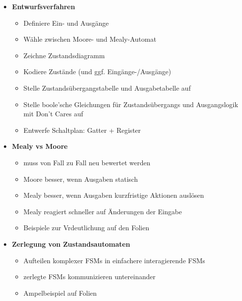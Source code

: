 \documentclass[11pt,a4paper]{article}
\begin{document}
\begin{itemize}
\begin{itemize}
\item \textbf{Entwurfsverfahren}
	\begin{itemize}
	\item Definiere Ein- und Ausgänge
	\item Wähle zwischen Moore- und Mealy-Automat
	\item Zeichne Zustandsdiagramm
	\item Kodiere Zustände (und ggf. Eingänge-/Ausgänge)
	\item Stelle Zustandsübergangstabelle und Ausgabetabelle auf
	\item Stelle boole'sche Gleichungen für Zustandsübergangs und Ausgangslogik mit Don't Cares auf
	\item Entwerfe Schaltplan: Gatter + Register
	\end{itemize}

\item \textbf{Mealy vs Moore}
	\begin{itemize}
	\item muss von Fall zu Fall neu bewertet werden
	\item Moore besser, wenn Ausgaben statisch
	\item Mealy besser, wenn Ausgaben kurzfristige Aktionen auslösen
	\item Mealy reagiert schneller auf Änderungen der Eingabe
	\item Beispiele zur Vrdeutlichung auf den Folien
	\end{itemize}
	
\item \textbf{Zerlegung von Zustandsautomaten}
	\begin{itemize}
	
	\item Aufteilen komplexer FSMs in einfachere interagierende FSMs
	\item zerlegte FSMs kommunizieren untereinander
	\item Ampelbeispiel auf Folien
	
	\end{itemize}

\end{itemize}
\end{itemize}
\end{document}
